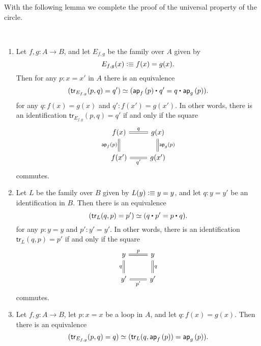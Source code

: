 With the following lemma we complete the proof of the universal property of the circle. 

\begin{samepage}%
\begin{lem}\label{lem:circle_up_tr_compute} ~
\begin{enumerate}
\item Let $f,g:A \to B$, and let $E_{f,g}$ be the family over $A$ given by 
\begin{equation*}
E_{f,g}(x)\vcentcolon\equiv f(x)=g(x).
\end{equation*}
Then for any $p:x=x'$ in $A$ there is an equivalence
\begin{equation*}
\eqv{(\mathsf{tr}_{E_{f,g}}(p,q)=q')}{(\ct{\ap{f}{p}}{q'}=\ct{q}{\ap{g}{p}})}.
\end{equation*}
for any $q:f(x)=g(x)$ and $q':f(x')=g(x')$. In other words, there is an identification $\mathsf{tr}_{E_{f,g}}(p,q)=q'$ if and only if the square
\begin{equation*}
\begin{tikzcd}
f(x) \arrow[r,equals,"q"] \arrow[d,equals,swap,"\ap{f}{p}"] & g(x) \arrow[d,equals,"\ap{g}{p}"] \\
f(x') \arrow[r,equals,swap,"{q'}"] & g(x') 
\end{tikzcd}
\end{equation*}
commutes.
\item Let $L$ be the family over $B$ given by $L(y)\vcentcolon\equiv y=y$, and let $q:y=y'$ be an identification in $B$. Then there is an equivalence
\begin{equation*}
\eqv{(\mathsf{tr}_L(q,p)=p')}{(\ct{q}{p'}=\ct{p}{q})}. 
\end{equation*}
for any $p:y=y$ and $p':y'=y'$. In other words, there is an identification $\mathsf{tr}_L(q,p)=p'$ if and only if the square
\begin{equation*}
\begin{tikzcd}
y \arrow[r,equals,"p"] \arrow[d,swap,equals,"q"] & y \arrow[d,equals,"q"] \\
y' \arrow[r,equals,swap,"{p'}"] & y'
\end{tikzcd}
\end{equation*}
commutes.
\item Let $f,g:A \to B$, let $p:x=x$ be a loop in $A$, and let $q:f(x)=g(x)$. Then there is an equivalence
\begin{equation*}
\eqv{(\mathsf{tr}_{E_{f,g}}(p,q)=q)}{(\mathsf{tr}_L(q,\ap{f}{p})=\ap{g}{p}).}
\end{equation*}
\end{enumerate}
\end{lem}
\end{samepage}%

